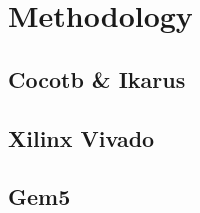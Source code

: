 %
\chapter{Methodology}
\label{sec:method}

\section{Cocotb \& Ikarus}
\label{sec:concepts:sec1}


\section{Xilinx Vivado}
\label{sec:concepts:sec2}


\section{Gem5}
\label{sec:concepts:sec3}

